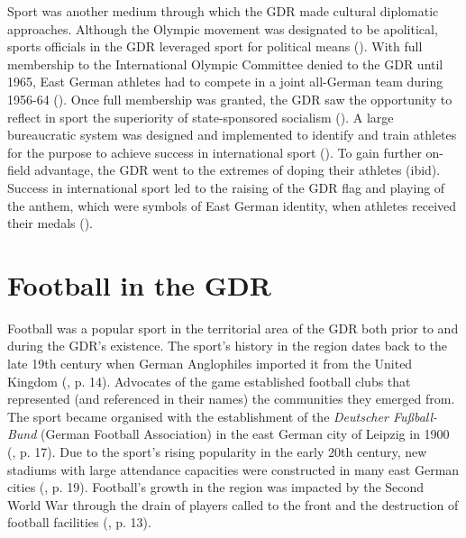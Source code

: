 Sport was another medium through which the GDR made cultural diplomatic approaches. Although the Olympic movement was designated to be apolitical, sports officials in the GDR leveraged sport for political means (\cite{balbier2009}). With full membership to the International Olympic Committee denied to the GDR until 1965, East German athletes had to compete in a joint all-German team during 1956-64 (\cite{balbier2009}). Once full membership was granted, the GDR saw the opportunity to reflect in sport the superiority of state-sponsored socialism (\cite{frenkin1964}). A large bureaucratic system was designed and implemented to identify and train athletes for the purpose to achieve success in international sport (\cite{dennisgrix2012}). To gain further on-field advantage, the GDR went to the extremes of doping their athletes (ibid). Success in international sport led to the raising of the GDR flag and playing of the anthem, which were symbols of East German identity, when athletes received their medals (\cite{balbier2009}).

\section*{Football in the GDR}

Football was a popular sport in the territorial area of the GDR both prior to and during the GDR’s existence. The sport’s history in the region dates back to the late 19th century when German Anglophiles imported it from the United Kingdom (\cite{mcdougall2014}, p. 14). Advocates of the game established football clubs that represented (and referenced in their names) the communities they emerged from. The sport became organised with the establishment of the \textit{Deutscher Fußball-Bund} (German Football Association) in the east German city of Leipzig in 1900 (\cite{peifferschulze-marmeling2008}, p. 17). Due to the sport’s rising popularity in the early 20th century, new stadiums with large attendance capacities were constructed in many east German cities (\cite{mcdougall2014}, p. 19). Football’s growth in the region was impacted by the Second World War through the drain of players called to the front and the destruction of football facilities (\cite{fuge2009}, p. 13).

